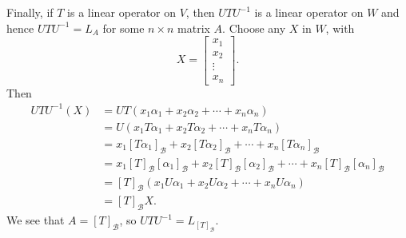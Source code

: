 \begin{solution}
  Finally, if $T$ is a linear operator on $V$, then $UTU^{-1}$ is a
  linear operator on $W$ and hence $UTU^{-1} = L_A$ for some
  $n\times n$ matrix $A$. Choose any $X$ in $W$, with
  \begin{equation*}
    X =
    \begin{bmatrix}
      x_1 \\ x_2 \\ \vdots \\ x_n
    \end{bmatrix}.
  \end{equation*}
  Then
  \begin{align*}
    UTU^{-1}(X)
    &= UT(x_1\alpha_1 + x_2\alpha_2 + \cdots + x_n\alpha_n) \\
    &= U(x_1T\alpha_1 + x_2T\alpha_2 + \cdots + x_nT\alpha_n) \\
    &= x_1[T\alpha_1]_{\mathcal{B}} + x_2[T\alpha_2]_{\mathcal{B}}
      + \cdots + x_n[T\alpha_n]_{\mathcal{B}} \\
    &= x_1[T]_{\mathcal{B}}[\alpha_1]_{\mathcal{B}}
      + x_2[T]_{\mathcal{B}}[\alpha_2]_{\mathcal{B}}
      + \cdots
      + x_n[T]_{\mathcal{B}}[\alpha_n]_{\mathcal{B}} \\
    &= [T]_{\mathcal{B}}(x_1U\alpha_1 + x_2U\alpha_2
      + \cdots + x_nU\alpha_n) \\
    &= [T]_{\mathcal{B}}X.
  \end{align*}
  We see that $A = [T]_{\mathcal{B}}$, so
  $UTU^{-1} = L_{[T]_{\mathcal{B}}}$.
\end{solution}
